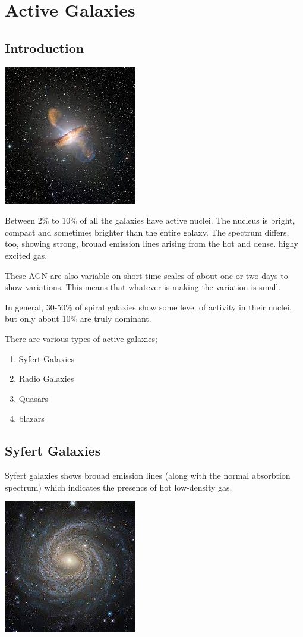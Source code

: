 \documentclass{book}
\begin{document}
\chapter{Active Galaxies}
\section{Introduction}

\includegraphics{agn.jpeg}


Between 2\% to 10\% of all the galaxies have active nuclei. The nucleus is bright, compact and sometimes brighter than the entire galaxy. The spectrum differs, too, showing strong, brouad emission lines arising from the hot and dense. highy excited gas.
\bigskip


These AGN are also variable on short time scales of about one or two days to show variations. This means that whatever is making the variation is small.
	
	In general, 30-50\% of spiral galaxies show some level of activity in their nuclei, but only about 10\% are truly dominant.  



There are various types of active galaxies;
\begin{enumerate}
\item Syfert Galaxies
\item Radio Galaxies
\item Quasars
\item blazars
\end{enumerate}

\section{Syfert Galaxies}
Syfert galaxies shows brouad emission lines (along with the normal absorbtion spectrum) which indicates the presencs of hot low-density gas.

\includegraphics{syfert.jpeg}
\end{document}
